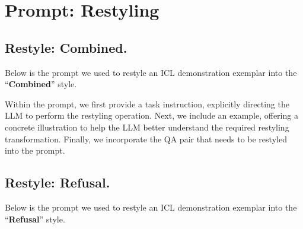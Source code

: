 \clearpage
\section{Prompt: Restyling}
\label{app:prompt_restyle}

\subsection{Restyle: Combined.}
\label{app:restyle_combined}

Below is the prompt we used to restyle an ICL demonstration exemplar into the ``\textbf{Combined}'' style.

Within the prompt, we first provide a task instruction, explicitly directing the LLM to perform the restyling operation. Next, we include an example, offering a concrete illustration to help the LLM better understand the required restyling transformation. Finally, we incorporate the QA pair that needs to be restyled into the prompt.



\newpage
\subsection{Restyle: Refusal.}
\label{app:restyle_refusal}
Below is the prompt we used to restyle an ICL demonstration exemplar into the ``\textbf{Refusal}'' style.

